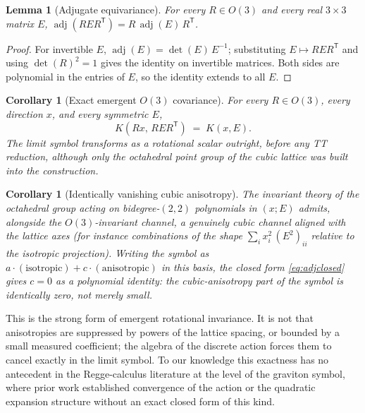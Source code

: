 \documentclass[11pt]{article}
\newtheorem{lemma}[theorem]{Lemma}
\newtheorem{corollary}[theorem]{Corollary}
\theoremstyle{definition}
\theoremstyle{remark}
\DeclareMathOperator{\adjE}{adj}
\newcommand{\trans}{\mathsf{T}}
\begin{document}
\begin{lemma}[Adjugate equivariance]
\label{lem:equivariance}
For every $R\in O(3)$ and every real $3\times3$ matrix $E$, $\adjE(RER^{\trans}) = R\,\adjE(E)\,R^{\trans}$.
\end{lemma}

\begin{proof}
For invertible $E$, $\adjE(E)=\det(E)\,E^{-1}$; substituting $E\mapsto RER^{\trans}$ and using $\det(R)^2=1$ gives the identity on invertible matrices. Both sides are polynomial in the entries of $E$, so the identity extends to all $E$.
\end{proof}

\begin{corollary}[Exact emergent $O(3)$ covariance]
\label{cor:o3}
For every $R\in O(3)$, every direction $x$, and every symmetric $E$,
\begin{equation}
K(Rx,\,RER^{\trans}) \;=\; K(x,E).
\end{equation}
The limit symbol transforms as a rotational scalar outright, before any TT reduction, although only the octahedral point group of the cubic lattice was built into the construction.
\end{corollary}

\begin{corollary}[Identically vanishing cubic anisotropy]
\label{cor:cubic}
The invariant theory of the octahedral group acting on bidegree-$(2,2)$ polynomials in $(x;E)$ admits, alongside the $O(3)$-invariant channel, a genuinely cubic channel aligned with the lattice axes (for instance combinations of the shape $\sum_i x_i^2\,(E^2)_{ii}$ relative to the isotropic projection). Writing the symbol as $a\cdot(\text{isotropic}) + c\cdot(\text{anisotropic})$ in this basis, the closed form \eqref{eq:adjclosed} gives $c = 0$ as a polynomial identity: the cubic-anisotropy part of the symbol is identically zero, not merely small.
\end{corollary}

This is the strong form of emergent rotational invariance. It is not that anisotropies are suppressed by powers of the lattice spacing, or bounded by a small measured coefficient; the algebra of the discrete action forces them to cancel exactly in the limit symbol. To our knowledge this exactness has no antecedent in the Regge-calculus literature at the level of the graviton symbol, where prior work established convergence of the action \cite{CMS} or the quadratic expansion structure \cite{RocekWilliams, HamberWilliams} without an exact closed form of this kind.
\end{document}
